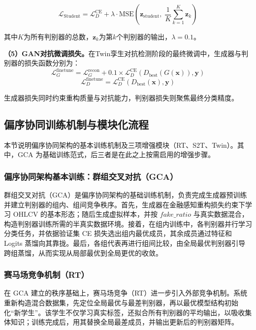 \begin{equation}
\mathcal{L}_{\text{Student}} = \mathcal{L}_D^{\text{CE}} + \lambda \cdot \text{MSE}\left(\mathbf{z}_{\text{student}},\; \frac{1}{K}\sum_{k=1}^{K}\mathbf{z}_k\right)
\label{eq:rt_student_loss}
\end{equation}

其中$K$为所有判别器的总数，$\mathbf{z}_k$为第$k$个判别器的输出，$\lambda=0.1$。

\textbf{（5）GAN对抗微调损失。}在Twin孪生对抗检测阶段的最终微调中，生成器与判别器的损失函数分别为：
\begin{equation}
\mathcal{L}_{G}^{\text{finetune}} = \mathcal{L}_{G}^{\text{recon}} + 0.1 \times \mathcal{L}_{D}^{\text{CE}}(D_{\text{best}}(G(\mathbf{x})), \mathbf{y})
\label{eq:gan_finetune_g}
\end{equation}
\begin{equation}
\mathcal{L}_{D}^{\text{finetune}} = \mathcal{L}_{D}^{\text{CE}}(D_{\text{best}}(\mathbf{x}), \mathbf{y})
\label{eq:gan_finetune_d}
\end{equation}

生成器损失同时约束重构质量与对抗能力，判别器损失则聚焦最终分类精度。

\subsection{偏序协同训练机制与模块化流程}
本节说明偏序协同架构的基本训练机制及三项增强模块（RT、S2T、Twin）。其中，GCA 为基础训练范式，后三者是在此之上按需启用的增强步骤。

\subsubsection{偏序协同架构基本训练：群组交叉对抗（GCA）}
群组交叉对抗（GCA）是偏序协同架构的基础训练机制，负责完成生成器预训练并建立判别器的组内、组间竞争秩序。首先，生成器在金融感知重构损失约束下学习 OHLCV 的基本形态；随后生成虚拟样本，并按 $fake\_ratio$ 与真实数据混合，构造判别器训练所需的半真实数据环境。接着，在组内训练中，各判别器并行学习分类任务，并依据验证集 CE 损失选出组内最优成员，其余成员通过特征和 Logits 蒸馏向其靠拢。最后，各组代表再进行组间比较，由全局最优判别器引导跨组蒸馏，从而实现从局部最优到全局更优的收敛。

\subsubsection{赛马场竞争机制（RT）}
在 GCA 建立的秩序基础上，赛马场竞争（RT）进一步引入外部竞争机制。系统重新构造混合数据集，先定位全局最优与最差判别器，再以最优模型结构初始化“新学生”。该学生不仅学习真实标签，还拟合所有判别器的平均输出，以吸收集体知识；训练完成后，用其替换全局最差成员，并输出更新后的判别器矩阵。

